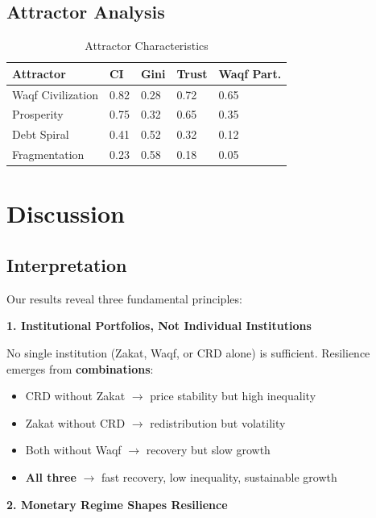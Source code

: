 \documentclass[12pt,a4paper]{article}
\begin{document}
\subsection{Attractor Analysis}

\begin{table}[H]
\centering
\caption{Attractor Characteristics}
\label{tab:attractors}
\begin{tabular}{p{4cm} p{2cm} p{2cm} p{2cm} p{2cm}}
\toprule
\textbf{Attractor} & \textbf{CI} & \textbf{Gini} & \textbf{Trust} & \textbf{Waqf Part.} \\
\midrule
Waqf Civilization & 0.82 & 0.28 & 0.72 & 0.65 \\
Prosperity & 0.75 & 0.32 & 0.65 & 0.35 \\
Debt Spiral & 0.41 & 0.52 & 0.32 & 0.12 \\
Fragmentation & 0.23 & 0.58 & 0.18 & 0.05 \\
\bottomrule
\end{tabular}
\end{table}

\section{Discussion}

\subsection{Interpretation}

Our results reveal three fundamental principles:

\textbf{1. Institutional Portfolios, Not Individual Institutions}

No single institution (Zakat, Waqf, or CRD alone) is sufficient. Resilience emerges from \textbf{combinations}:
\begin{itemize}
    \item CRD without Zakat $\rightarrow$ price stability but high inequality
    \item Zakat without CRD $\rightarrow$ redistribution but volatility
    \item Both without Waqf $\rightarrow$ recovery but slow growth
    \item \textbf{All three} $\rightarrow$ fast recovery, low inequality, sustainable growth
\end{itemize}

\textbf{2. Monetary Regime Shapes Resilience}
\end{document}
